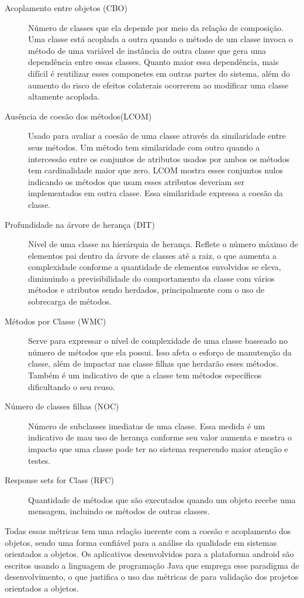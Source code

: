\begin{description}
\item[Acoplamento entre objetos (CBO)] Número de classes que ela depende por
meio da relação de composição. Uma classe está acoplada a outra quando o método
de um classe invoca o método de uma variável de instância de outra classe que
gera uma dependência entre essas classes. Quanto maior essa dependência, mais
difícil é reutilizar esses componetes em outras partes do sistema, além do
aumento do risco de efeitos colaterais ocorrerem ao modificar uma classe
altamente acoplada.
\item[Ausência de coesão dos métodos(LCOM)] Usado para avaliar a coesão de uma
classe através da similaridade entre seus métodos. Um método tem similaridade
com outro quando a intercessão entre os conjuntos de atributos usados por ambos
os métodos tem cardinalidade maior que zero. LCOM mostra esses conjuntos nulos
indicando os métodos que usam esses atributos deveriam ser implementados em
outra classe. Essa similaridade expressa a coesão da classe.
\item[Profundidade na árvore de herança (DIT)] Nível de uma classe na
hierárquia de herança. Reflete o número máximo de elementos pai dentro da árvore
de classes até a raiz, o que aumenta a complexidade conforme a quantidade de
elementos envolvidos se eleva, diminuindo a previsibilidade do comportamento da
classe com vários métodos e atributos sendo herdados, principalmente com o uso
de sobrecarga de métodos.
\item[Métodos por Classe (WMC)] Serve para expressar o nível de complexidade de
uma classe basseado no número de métodos que ela possui. Isso afeta o esforço de
manutenção da classe, além de impactar nas classe filhas que herdarão esses
métodos. Também é um indicativo de que a classe tem métodos específicos
dificultando o seu reuso.
\item[Número de classes filhas (NOC)] Número de subclasses imediatas de uma
classe. Essa medida é um indicativo de mau uso de herança conforme seu valor
aumenta e mostra o impacto que uma classe pode ter no sistema requerendo maior
atenção e testes.
\item[Response sets for Class (RFC)] Quantidade de métodos que são executados
quando um objeto recebe uma mensagem, incluindo os métodos de outras classes. 
\end{description}

Todas essas métricas tem uma relação inerente com a coesão e acoplamento dos
objetos, sendo uma forma confiável para a análise da qualidade em sistemas
orientados a objetos. Os aplicativos desenvolvidos para a plataforma android são
escritos usando a linguagem de programação Java que emprega esse paradigma de
desenvolvimento, o que justifica o uso das métricas de  para
validação dos projetos orientados a objetos.

